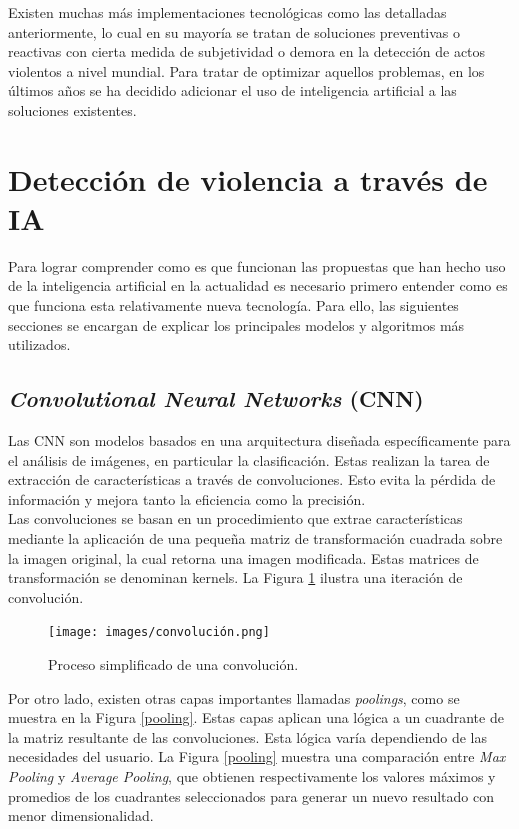 Existen muchas más implementaciones tecnológicas como las 
detalladas anteriormente, lo cual en su mayoría se tratan de 
soluciones preventivas o reactivas con cierta medida de 
subjetividad o demora en la detección de actos violentos a 
nivel mundial. Para tratar de optimizar aquellos problemas, 
en los últimos años se ha decidido adicionar el 
uso de inteligencia artificial a las soluciones existentes.

\section{Detección de violencia a través de IA}\label{detecciónIA}
\thispagestyle{fancy}

Para lograr comprender como es que funcionan las propuestas 
que han hecho uso de la inteligencia artificial en la 
actualidad es necesario primero entender como es que funciona 
esta relativamente nueva tecnología. Para ello, 
las siguientes secciones se encargan de explicar los 
principales modelos y algoritmos más utilizados.

\subsection{\textit{Convolutional Neural Networks} (CNN)}

Las CNN son modelos basados en una arquitectura diseñada
específicamente para el análisis de imágenes, en particular
la clasificación. Estas realizan la tarea de extracción de
características a través de convoluciones. Esto evita la 
pérdida de información y mejora tanto la eficiencia como 
la precisión.\\

Las convoluciones se basan en un procedimiento que extrae
características mediante la aplicación de una pequeña matriz
de transformación cuadrada sobre la imagen original, la cual
retorna una imagen modificada. Estas matrices de transformación
se denominan kernels. La Figura \ref{convolucion} ilustra una
iteración de convolución.\\

\begin{figure}[h!] 
    \texttt{[image: images/convolución.png]} 
    \centering 
    \caption{Proceso simplificado de una convolución\protect\cite{convoluciones}.} 
    \label{convolucion} 
\end{figure}

Por otro lado, existen otras capas importantes llamadas
\textit{poolings}, como se muestra en la Figura \ref{pooling}.
Estas capas aplican una lógica a un cuadrante de la matriz
resultante de las convoluciones. Esta lógica varía dependiendo
de las necesidades del usuario. La Figura \ref{pooling} muestra una comparación
entre \textit{Max Pooling} y \textit{Average Pooling}, que obtienen
respectivamente los valores máximos y promedios de los cuadrantes
seleccionados para generar un nuevo resultado con menor dimensionalidad.

